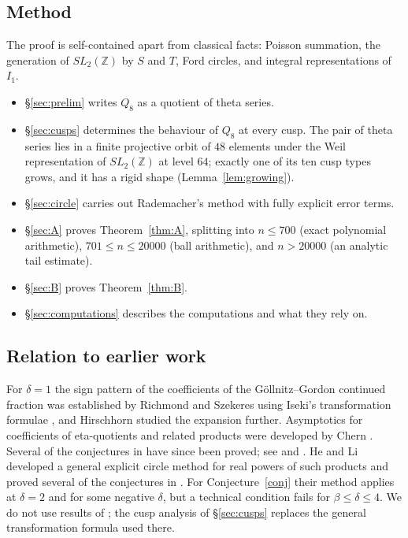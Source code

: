 \documentclass[11pt]{amsart}
\theoremstyle{remark}
\theoremstyle{definition}
\newcommand{\Z}{\mathbb Z}
\begin{document}
\subsection*{Method}
The proof is self-contained apart from classical facts: Poisson summation, the generation of $SL_2(\Z)$ by $S$ and $T$, Ford circles, and integral representations of $I_1$.
\begin{itemize}[leftmargin=2em]
\item \S\ref{sec:prelim} writes $Q_8$ as a quotient of theta series.
\item \S\ref{sec:cusps} determines the behaviour of $Q_8$ at every cusp. The pair of theta series lies in a finite projective orbit of $48$ elements under the Weil representation of $SL_2(\Z)$ at level $64$; exactly one of its ten cusp types grows, and it has a rigid shape (Lemma~\ref{lem:growing}).
\item \S\ref{sec:circle} carries out Rademacher's method with fully explicit error terms.
\item \S\ref{sec:A} proves Theorem~\ref{thm:A}, splitting into $n\le700$ (exact polynomial arithmetic), $701\le n\le20000$ (ball arithmetic), and $n>20000$ (an analytic tail estimate).
\item \S\ref{sec:B} proves Theorem~\ref{thm:B}.
\item \S\ref{sec:computations} describes the computations and what they rely on.
\end{itemize}

\subsection*{Relation to earlier work}
For $\delta=1$ the sign pattern of the coefficients of the G\"ollnitz--Gordon continued fraction was established by Richmond and Szekeres \cite{RS} using Iseki's transformation formulae \cite{Iseki}, and Hirschhorn \cite{Hirschhorn} studied the expansion further. Asymptotics for coefficients of eta-quotients and related products were developed by Chern \cite{Chern}. Several of the conjectures in \cite{SZ} have since been proved; see \cite{HL} and \cite{BHK}.
He and Li \cite{HL} developed a general explicit circle method for real powers of such products and proved several of the conjectures in \cite{SZ}. For Conjecture~\ref{conj} their method applies at $\delta=2$ and for some negative $\delta$, but a technical condition fails for $\beta\le\delta\le4$. We do not use results of \cite{HL}; the cusp analysis of \S\ref{sec:cusps} replaces the general transformation formula used there.
\end{document}
